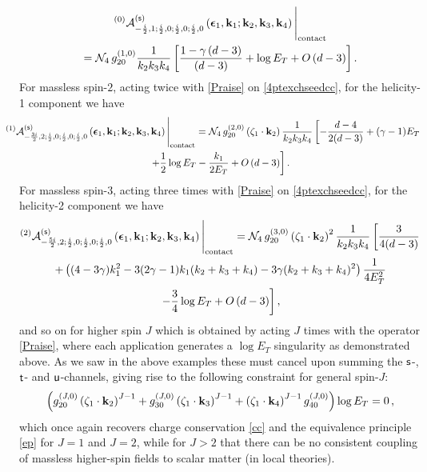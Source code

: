 \documentclass[11pt,a4paper]{article}
\begin{document}
\begin{multline}
   {}^{\left(0\right)}{\cal A}^{\left({\sf s}\right)}_{-\frac{i}{2},1;\frac{i}{2},0;\frac{i}{2},0;\frac{i}{2},0}\left(\boldsymbol{\epsilon}_1,{\bf k}_1;{\bf k}_2,{\bf k}_3,{\bf k}_4\right)\Bigg|_{\text{contact}} \\ = {\cal N}_4\, g_{20}^{(1,0)} \frac{1}{k_2 k_3 k_4}\left[\frac{1-\gamma\left(d-3\right)}{\left(d-3\right)}+\log E_T+O\left(d-3\right)\right].
\end{multline}
For massless spin-$2$, acting twice with \eqref{Praise} on \eqref{4ptexchseedcc}, for the helicity-1 component we have
\begin{multline}
  \hspace*{-0.5cm} {}^{\left(1\right)}{\cal A}^{\left({\sf s}\right)}_{-\frac{3i}{2},2;\frac{i}{2},0;\frac{i}{2},0;\frac{i}{2},0}\left(\boldsymbol{\epsilon}_1,{\bf k}_1;{\bf k}_2,{\bf k}_3,{\bf k}_4\right)\Bigg|_{\text{contact}} = {\cal N}_4\, g_{20}^{(2,0)}\left(\zeta_1 \cdot {\bf k}_2\right)\frac{1}{k_2 k_3 k_4} \left[-\frac{d-4}{2(d-3)}+ (\gamma -1)E_T\right.\\\left.+\frac{1}{2}\log E_T-\frac{ k_1}{2E_T}+O\left(d-3\right)\right].
\end{multline}
For massless spin-$3$, acting three times with \eqref{Praise} on \eqref{4ptexchseedcc}, for the helicity-2 component we have
\begin{multline}
   {}^{\left(2\right)}{\cal A}^{\left({\sf s}\right)}_{-\frac{5i}{2},2;\frac{i}{2},0;\frac{i}{2},0;\frac{i}{2},0}\left(\boldsymbol{\epsilon}_1,{\bf k}_1;{\bf k}_2,{\bf k}_3,{\bf k}_4\right)\Bigg|_{\text{contact}} =  {\cal N}_4\,g_{20}^{(3,0)}\left(\zeta_1 \cdot {\bf k}_2\right)^2\frac{1}{k_2k_3k_4}\left[\frac{3}{4 (d-3)}\right.\\+\left((4-3 \gamma ) k^2_1-3 (2 \gamma -1) k_1 (k_2+k_3+k_4)-3 \gamma  (k_2+k_3+k_4)^2\right)\frac{1}{4 E^2_T}\\\left.-\frac{3}{4}\log E_T+O\left(d-3\right)\right],
\end{multline}
and so on for higher spin $J$ which is obtained by acting $J$ times with the operator \eqref{Praise}, where each application generates a $\log E_T$ singularity as demonstrated above. As we saw in the above examples these must cancel upon summing the ${\sf s}$-, ${\sf t}$- and ${\sf u}$-channels, giving rise to the following constraint for general spin-$J$:
\begin{align}
    \left(g^{\left(J,0\right)}_{20}\left(\zeta_1 \cdot {\bf k}_2\right)^{J-1}+g^{\left(J,0\right)}_{30}\left(\zeta_1 \cdot {\bf k}_3\right)^{J-1}+\left(\zeta_1 \cdot {\bf k}_4\right)^{J-1}g^{\left(J,0\right)}_{40}\right)\log E_T=0\,,
\end{align}
which once again recovers charge conservation \eqref{cc} and the equivalence principle \eqref{ep} for $J=1$ and $J=2$, while for $J>2$ that there can be no consistent coupling of massless higher-spin fields to scalar matter (in local theories).
\end{document}
